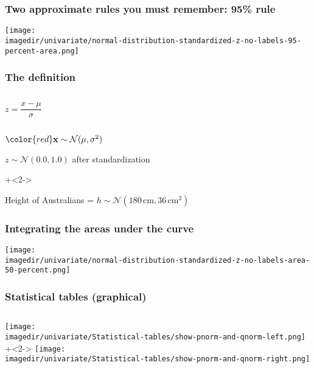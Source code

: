 \begin{frame}\frametitle{Two approximate rules you must remember: 95\% rule}
	\begin{center}
		\texttt{[image: \\imagedir/univariate/normal-distribution-standardized-z-no-labels-95-percent-area.png]}
	\end{center}
\end{frame}

\begin{frame}\frametitle{The {\color{purple}{standard form}} definition}
	\begin{columns}[T]
		\column{\textwidth}
		
			
			\[z = \dfrac{x - \mu}{\sigma}\]
		
	\end{columns}
	
	\vspace{36pt}
	\begin{itemize}
		\item	${\color{red} \mathbf{x}} \sim \mathcal{N}(\mu, \sigma^2)$ \hfill {\color{myOrange}{$\longleftarrow$ do not use the standard deviation, use $\sigma^2$}}
		\item	$z \sim \mathcal{N}(0.0, 1.0)$ after standardization

		
		\vspace{36pt}
		\onslide+<2->{
			\item	Height of Australians = $h \sim \mathcal{N}(180\,\text{cm}, 36\,\text{cm}^2)$
		}

	\end{itemize}
\end{frame}

\begin{frame}\frametitle{Integrating the areas under the curve}
	\centerline{	\texttt{[image: \\imagedir/univariate/normal-distribution-standardized-z-no-labels-area-50-percent.png]}	}
\end{frame}

\begin{frame}\frametitle{Statistical tables (graphical)}
	\begin{columns}[T]
			\texttt{[image: \\imagedir/univariate/Statistical-tables/show-pnorm-and-qnorm-left.png]}
			\onslide+<2->{
				\texttt{[image: \\imagedir/univariate/Statistical-tables/show-pnorm-and-qnorm-right.png]}
			}
	\end{columns}
\end{frame}

